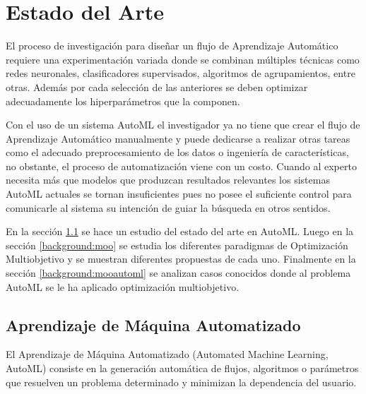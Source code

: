 \chapter{Estado del Arte}\label{chapter:state-of-the-art}
El proceso de investigaci\'on para dise\~nar un flujo de Aprendizaje Autom\'atico requiere una experimentaci\'on variada donde se combinan m\'ultiples t\'ecnicas como redes neuronales, clasificadores supervisados, algoritmos de agrupamientos, entre otras. Adem\'as por cada selecci\'on de las anteriores se deben optimizar adecuadamente los hiperpar\'ametros que la componen.

Con el uso de un sistema AutoML el investigador ya no tiene que crear el flujo de Aprendizaje Autom\'atico manualmente y puede dedicarse a realizar otras tareas como el adecuado preprocesamiento de los datos o ingenier\'ia de caracter\'isticas, no obstante, el proceso de automatizaci\'on viene con un costo. Cuando al experto necesita m\'as que modelos que produzcan resultados relevantes los sistemas AutoML actuales se tornan insuficientes pues no posee el suficiente control para comunicarle al sistema su intenci\'on de guiar la b\'usqueda en otros sentidos.

En la secci\'on \ref{background:automl} se  hace un estudio del estado del arte en AutoML. Luego en la secci\'on \ref{background:moo} se estudia los diferentes paradigmas de Optimizaci\'on Multiobjetivo y se muestran diferentes propuestas de cada uno. Finalmente en la secci\'on \ref{background:mooautoml} se analizan casos conocidos donde al problema AutoML se le ha aplicado optimizaci\'on multiobjetivo.

\section{Aprendizaje de M\'aquina Automatizado}\label{background:automl}
El Aprendizaje de M\'aquina Automatizado (Automated Machine Learning, AutoML) consiste en la generaci\'on autom\'atica de flujos, algoritmos o par\'ametros que resuelven un problema determinado y minimizan la dependencia del usuario. 

